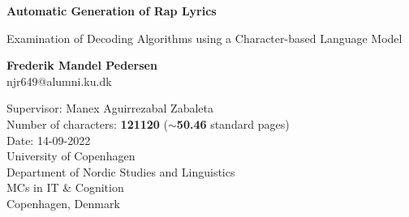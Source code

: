 \documentclass[10pt, a4paper]{article}
\newcommand{\thesisTitle}{Automatic Generation of Rap Lyrics}
\newcommand{\thesisSubtitle}{Examination of Decoding Algorithms using a Character-based Language Model}
\newcommand{\thesisName}{Frederik Mandel Pedersen}
\newcommand{\thesisDate}{September 2022}
\newcommand{\thesisSupervisor}{Manex Aguirrezabal Zabaleta}
\begin{document}
\begin{titlepage}
    \begin{center}
        \vspace*{7cm}
        
        \huge
        \textbf{\thesisTitle}
        
        \vspace{0.2cm}
        \LARGE
        \thesisSubtitle
        
        \vspace{2cm}
        
        \textbf{\Large \thesisName} \\
        \Large{njr649@alumni.ku.dk}
        
        \vspace{0.4cm}
        
        \large{Supervisor: \thesisSupervisor \\
        
        \vspace{3cm} Number of characters: \textbf{121120} ($\sim$\textbf{50.46} standard pages)\\
        \vspace{0.25cm} Date: 14-09-2022\\
        \vspace{1.75cm} \large{University of Copenhagen} \\
        \vspace{0.15cm} Department of Nordic Studies and Linguistics \\
        \vspace{0.15cm} MCs in IT \& Cognition \\
        \vspace{0.15cm} Copenhagen, Denmark}
        
        \vfill
        
        \date{\thesisDate}
    \end{center}
\end{titlepage}

\newpage
\tableofcontents
    \listoftables
    \listoffigures
\newpage


\bigskip
\setlength{\columnsep}{1cm}
\begin{multicols}{2}









\end{multicols}
\clearpage

\end{document}
